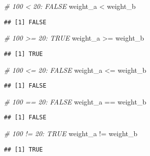 \documentclass[]{article}
\newenvironment{Shaded}{\begin{snugshade}}{\end{snugshade}}
\newcommand{\StringTok}[1]{\textcolor[rgb]{0.31,0.60,0.02}{{#1}}}
\newcommand{\CommentTok}[1]{\textcolor[rgb]{0.56,0.35,0.01}{\textit{{#1}}}}
\newcommand{\NormalTok}[1]{{#1}}
\begin{document}
\begin{Shaded}
\begin{Highlighting}[]
\CommentTok{# 100 < 20: FALSE}
\NormalTok{weight_a <}\StringTok{ }\NormalTok{weight_b}
\end{Highlighting}
\end{Shaded}

\begin{verbatim}
## [1] FALSE
\end{verbatim}

\begin{Shaded}
\begin{Highlighting}[]
\CommentTok{# 100 >= 20: TRUE}
\NormalTok{weight_a >=}\StringTok{ }\NormalTok{weight_b}
\end{Highlighting}
\end{Shaded}

\begin{verbatim}
## [1] TRUE
\end{verbatim}

\begin{Shaded}
\begin{Highlighting}[]
\CommentTok{# 100 <= 20: FALSE}
\NormalTok{weight_a <=}\StringTok{ }\NormalTok{weight_b}
\end{Highlighting}
\end{Shaded}

\begin{verbatim}
## [1] FALSE
\end{verbatim}

\begin{Shaded}
\begin{Highlighting}[]
\CommentTok{# 100 == 20: FALSE}
\NormalTok{weight_a ==}\StringTok{ }\NormalTok{weight_b}
\end{Highlighting}
\end{Shaded}

\begin{verbatim}
## [1] FALSE
\end{verbatim}

\begin{Shaded}
\begin{Highlighting}[]
\CommentTok{# 100 != 20: TRUE}
\NormalTok{weight_a !=}\StringTok{ }\NormalTok{weight_b}
\end{Highlighting}
\end{Shaded}

\begin{verbatim}
## [1] TRUE
\end{verbatim}
\end{document}

